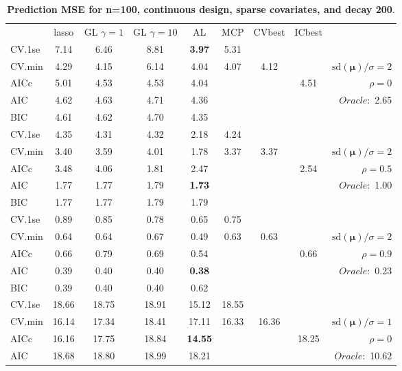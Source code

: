 \clearpage
\begin{table}\vspace{-.5cm}
\caption[l]{ { \bf Prediction MSE for n=100, continuous design, 
sparse covariates, and  decay  200}.}
\vspace{-.5cm}
\footnotesize{}
\begin{center}
\begin{tabular}{l*{7}{c}|r}
 & lasso & GL $\gamma=1$ & GL $\gamma=10$ & AL & MCP  & CVbest & ICbest  \\
\cline{1-9}
CV.1se & 7.14 & 6.46 & 8.81 & {\bf 3.97} & 5.31 & & & \\
CV.min & 4.29 & 4.15 & 6.14 & 4.04 & 4.07 & 4.12 & & $\mathrm{sd}(\mathbf{\mu})/\sigma=2$ \\
AICc & 5.01 & 4.53 & 4.53 & 4.04 & & & 4.51 &  $\rho=0$ \\
AIC & 4.62 & 4.63 & 4.71 & 4.36 & & & &  \multirow{2}{*}{$Oracle: $ 2.65} \\
BIC & 4.61 & 4.62 & 4.70 & 4.35 & & & &  \\
 \hline 
CV.1se & 4.35 & 4.31 & 4.32 & 2.18 & 4.24 & & & \\
CV.min & 3.40 & 3.59 & 4.01 & 1.78 & 3.37 & 3.37 & & $\mathrm{sd}(\mathbf{\mu})/\sigma=2$ \\
AICc & 3.48 & 4.06 & 1.81 & 2.47 & & & 2.54 &  $\rho=0.5$ \\
AIC & 1.77 & 1.77 & 1.79 & {\bf 1.73} & & & &  \multirow{2}{*}{$Oracle: $ 1.00} \\
BIC & 1.77 & 1.77 & 1.79 & 1.79 & & & &  \\
 \hline 
CV.1se & 0.89 & 0.85 & 0.78 & 0.65 & 0.75 & & & \\
CV.min & 0.64 & 0.64 & 0.67 & 0.49 & 0.63 & 0.63 & & $\mathrm{sd}(\mathbf{\mu})/\sigma=2$ \\
AICc & 0.66 & 0.79 & 0.69 & 0.54 & & & 0.66 &  $\rho=0.9$ \\
AIC & 0.39 & 0.40 & 0.40 & {\bf 0.38} & & & &  \multirow{2}{*}{$Oracle: $ 0.23} \\
BIC & 0.39 & 0.40 & 0.40 & 0.62 & & & &  \\
 \hline 
CV.1se & 18.66 & 18.75 & 18.91 & 15.12 & 18.55 & & & \\
CV.min & 16.14 & 17.34 & 18.41 & 17.11 & 16.33 & 16.36 & & $\mathrm{sd}(\mathbf{\mu})/\sigma=1$ \\
AICc & 16.16 & 17.75 & 18.84 & {\bf 14.55} & & & 18.25 &  $\rho=0$ \\
AIC & 18.68 & 18.80 & 18.99 & 18.21 & & & &  \multirow{2}{*}{$Oracle: $ 10.62} \\

\end{tabular}
\end{center}
\end{table}
